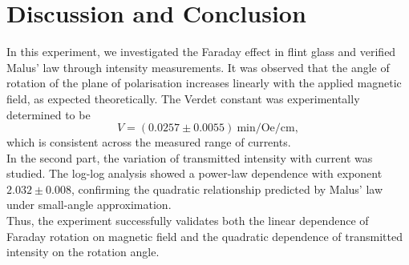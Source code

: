 \documentclass[usenames, svgnames, dvipsnames]{scrartcl}
\begin{document}
\section{Discussion and Conclusion}
In this experiment, we investigated the Faraday effect in flint glass and verified Malus' law through intensity measurements. It was observed that the angle of rotation of the plane of polarisation increases linearly with the applied magnetic field, as expected theoretically. The Verdet constant was experimentally determined to be
\[
V = (0.0257 \pm 0.0055) \ \text{min/Oe/cm},
\]
which is consistent across the measured range of currents.\\[0.2cm]
In the second part, the variation of transmitted intensity with current was studied. The log-log analysis showed a power-law dependence with exponent $2.032 \pm 0.008$, confirming the quadratic relationship predicted by Malus' law under small-angle approximation.\\[0.2cm]
Thus, the experiment successfully validates both the linear dependence of Faraday rotation on magnetic field and the quadratic dependence of transmitted intensity on the rotation angle.
\end{document}
